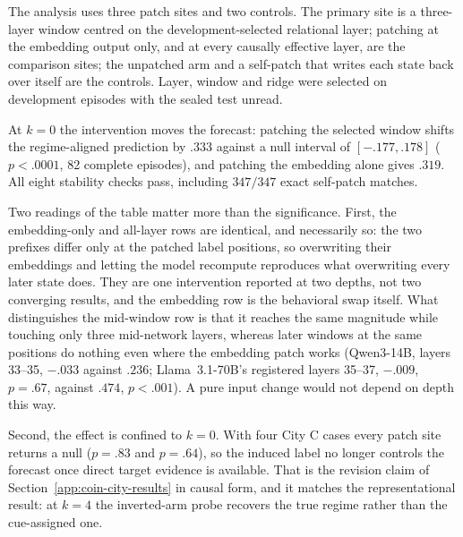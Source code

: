 The analysis uses three patch sites and two controls. The primary site is a
three-layer window centred on the development-selected relational layer;
patching at the embedding output only, and at every causally effective layer, are
the comparison sites; the unpatched arm and a self-patch that writes each state
back over itself are the controls. Layer, window and ridge were selected on
development episodes with the sealed test unread.

\begin{center}
\begin{minipage}{\linewidth}
\centering
{}
\label{tab:coin-city-causal-patch}
\small
\setlength{\tabcolsep}{4pt}
\resizebox{\linewidth}{!}{}
\end{minipage}
\end{center}

At $k=0$ the intervention moves the forecast: patching the selected window shifts
the regime-aligned prediction by $.333$ against a null interval of
$[-.177,.178]$ ($p<.0001$, 82 complete episodes), and patching the embedding
alone gives $.319$. All eight stability checks pass, including $347/347$ exact
self-patch matches.

Two readings of the table matter more than the significance. First, the
embedding-only and all-layer rows are identical, and necessarily so: the two
prefixes differ only at the patched label positions, so overwriting their embeddings
and letting the model recompute reproduces what overwriting every later state does. They are one intervention reported at two depths, not two
converging results, and the embedding row is the behavioral swap itself. What distinguishes the mid-window row is that it reaches the
same magnitude while touching only three mid-network layers, whereas later windows
at the same positions do nothing even where the embedding patch works (Qwen3-14B,
layers 33--35, $-.033$ against $.236$; Llama~3.1-70B's registered layers 35--37,
$-.009$, $p=.67$, against $.474$, $p<.001$). A pure input change would not depend
on depth this way.

Second, the effect is confined to $k=0$. With four City C cases every patch site
returns a null ($p=.83$ and $p=.64$), so the induced label no longer controls the
forecast once direct target evidence is available. That is the revision claim of
Section~\ref{app:coin-city-results} in causal form, and it matches the
representational result: at $k=4$ the inverted-arm probe recovers the true regime
rather than the cue-assigned one.

